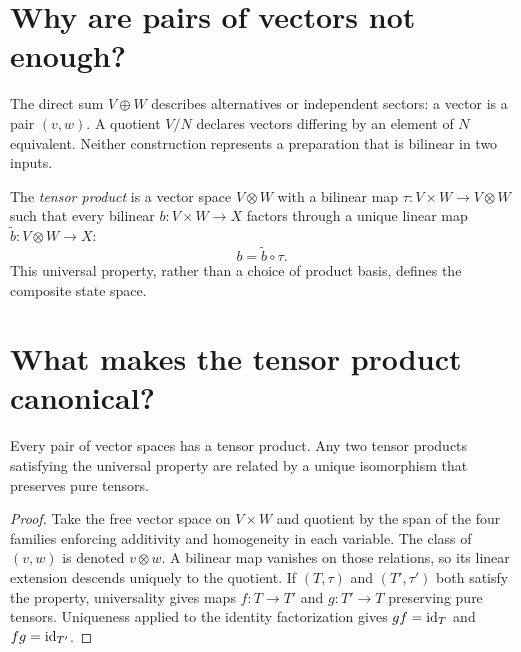 

\section{Why are pairs of vectors not enough?}

The direct sum $V\oplus W$ describes alternatives or independent sectors: a
vector is a pair $(v,w)$.  A quotient $V/N$ declares vectors differing by an
element of $N$ equivalent.  Neither construction represents a preparation
that is bilinear in two inputs.

The \emph{tensor product} is a vector space $V\otimes W$ with a bilinear map
$\tau:V\times W\to V\otimes W$ such that every bilinear
$b:V\times W\to X$ factors through a unique linear map
$\widetilde b:V\otimes W\to X$:
\[
b=\widetilde b\circ\tau.
\]
This universal property, rather than a choice of product basis, defines the
composite state space.

\section{What makes the tensor product canonical?}

\begin{theorem}
Every pair of vector spaces has a tensor product.  Any two tensor products
satisfying the universal property are related by a unique isomorphism that
preserves pure tensors.
\end{theorem}

\begin{proof}
Take the free vector space on $V\times W$ and quotient by the span of the four
families enforcing additivity and homogeneity in each variable.  The class of
$(v,w)$ is denoted $v\otimes w$.  A bilinear map vanishes on those relations,
so its linear extension descends uniquely to the quotient.  If $(T,\tau)$ and
$(T',\tau')$ both satisfy the property, universality gives maps
$f:T\to T'$ and $g:T'\to T$ preserving pure tensors.  Uniqueness applied to
the identity factorization gives $gf=\operatorname{id}_T$ and $fg=\operatorname{id}_{T'}$.
\end{proof}


